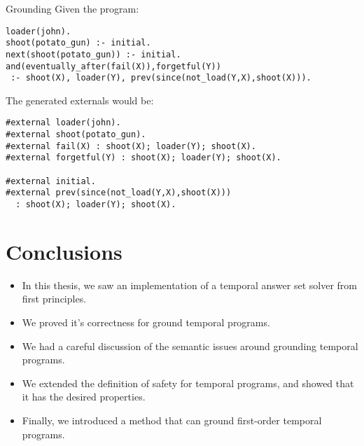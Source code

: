 \documentclass[aspectratio=169,xcolor=svgnames]{beamer}
\theoremstyle{theoremstyle_space}
\begin{document}
\begin{frame}[t,fragile]{Grounding}
Given the program:
\begin{lstlisting}[language=clingo,numbers=none]
loader(john).
shoot(potato_gun) :- initial.
next(shoot(potato_gun)) :- initial.
and(eventually_after(fail(X)),forgetful(Y)) 
 :- shoot(X), loader(Y), prev(since(not_load(Y,X),shoot(X))).
  \end{lstlisting}
The generated externals would be:
  \begin{lstlisting}[numbers=none]
#external loader(john).
#external shoot(potato_gun).
#external fail(X) : shoot(X); loader(Y); shoot(X).
#external forgetful(Y) : shoot(X); loader(Y); shoot(X).

#external initial.
#external prev(since(not_load(Y,X),shoot(X))) 
  : shoot(X); loader(Y); shoot(X).
  \end{lstlisting}
\end{frame}

\section{Conclusions}

\begin{frame}
  \begin{itemize}
  \item In this thesis, we saw an implementation of a temporal answer
    set solver from first principles.
  \item We proved it's correctness for ground temporal programs.
  \item We had a careful discussion of the semantic issues around
    grounding temporal programs.
  \item We extended the definition of safety for temporal programs,
    and showed that it has the desired properties.
  \item Finally, we introduced a method that can ground first-order temporal programs.
  \end{itemize}
\end{frame}
\end{document}
